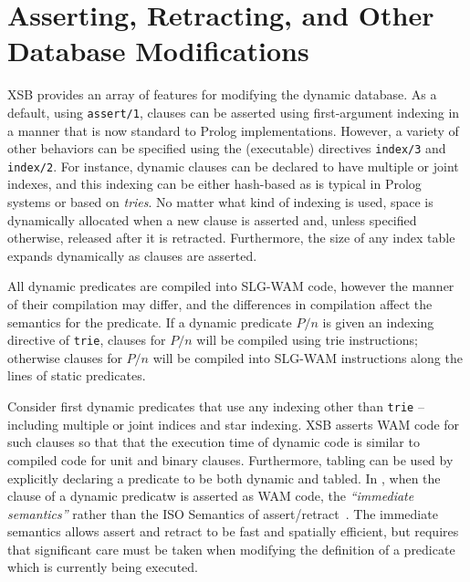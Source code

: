 
\section{Asserting, Retracting, and Other Database Modifications} \label{sec:assert}

XSB provides an array of features for modifying the dynamic database.
As a default, using {\tt assert/1}, clauses can be asserted using
first-argument indexing in a manner that is now standard to Prolog
implementations.  However, a variety of other behaviors can be
specified using the (executable) directives {\tt index/3} and {\tt
  index/2}.  For instance, dynamic clauses can be declared to have
multiple or joint indexes, and this indexing can be either hash-based
as is typical in Prolog systems or based on {\em tries}.  No matter
what kind of indexing is used, space is dynamically allocated when a
new clause is asserted and, unless specified otherwise, released after
it is retracted.  Furthermore, the size of any index table expands
dynamically as clauses are asserted.

All dynamic predicates are compiled into SLG-WAM code, however the
manner of their compilation may differ, and the differences in
compilation affect the semantics for the predicate.  If a dynamic
predicate $P/n$ is given an indexing directive of {\tt trie}, clauses
for $P/n$ will be compiled using trie instructions; otherwise clauses
for $P/n$ will be compiled into SLG-WAM instructions along the lines
of static predicates. 

Consider first dynamic predicates that use any indexing other than
{\tt trie} -- including multiple or joint indices and star indexing.
XSB asserts WAM code for such clauses so that that the execution time
of dynamic code is similar to compiled code for unit and binary
clauses.  Furthermore, tabling can be used by explicitly declaring a
predicate to be both dynamic and tabled.  In \version{}, when the
clause of a dynamic predicatw is asserted as WAM code, the {\em
  ``immediate semantics''} rather than the ISO Semantics of
assert/retract~\cite{LiOk87}.  The immediate semantics allows assert
and retract to be fast and spatially efficient, but requires that
significant care must be taken when modifying the definition of a
predicate which is currently being executed.


